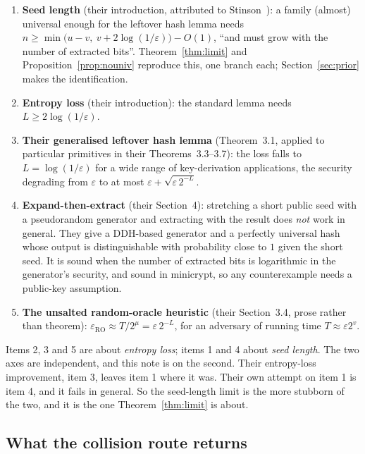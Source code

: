 \documentclass{aicr-solution}
\begin{document}
\begin{enumerate}
\item \textbf{Seed length} (their introduction, attributed to Stinson~\cite{Sti94}): a family
(almost) universal enough for the leftover hash lemma needs
$n \ge \min\bigl(u-v,\ v + 2\log(1/\varepsilon)\bigr) - O(1)$, ``and must grow with the number of
extracted bits''. Theorem~\ref{thm:limit} and Proposition~\ref{prop:nouniv} reproduce this, one
branch each; Section~\ref{sec:prior} makes the identification.

\item \textbf{Entropy loss} (their introduction): the standard lemma needs
$L \ge 2\log(1/\varepsilon)$.

\item \textbf{Their generalised leftover hash lemma} (Theorem~3.1, applied to particular primitives
in their Theorems~3.3--3.7): the loss falls to $L = \log(1/\varepsilon)$ for a wide range of
key-derivation applications, the security degrading from $\varepsilon$ to at most
$\varepsilon + \sqrt{\varepsilon\,2^{-L}}$.

\item \textbf{Expand-then-extract} (their Section~4): stretching a short public seed with a
pseudorandom generator and extracting with the result does \emph{not} work in general. They give a
DDH-based generator and a perfectly universal hash whose output is distinguishable with probability
close to $1$ given the short seed. It is sound when the number of extracted bits is logarithmic in
the generator's security, and sound in minicrypt, so any counterexample needs a public-key
assumption.

\item \textbf{The unsalted random-oracle heuristic} (their Section~3.4, prose rather than theorem):
$\varepsilon_{\mathrm{RO}} \approx T/2^{\mu} = \varepsilon\,2^{-L}$, for an adversary of running
time $T \approx \varepsilon 2^{v}$.
\end{enumerate}

Items 2, 3 and 5 are about \emph{entropy loss}; items 1 and 4 about \emph{seed length}. The two
axes are independent, and this note is on the second. Their entropy-loss improvement, item 3,
leaves item 1 where it was. Their own attempt on item 1 is item 4, and it fails in general. So the
seed-length limit is the more stubborn of the two, and it is the one Theorem~\ref{thm:limit} is
about.

\subsection*{What the collision route returns}
\end{document}
